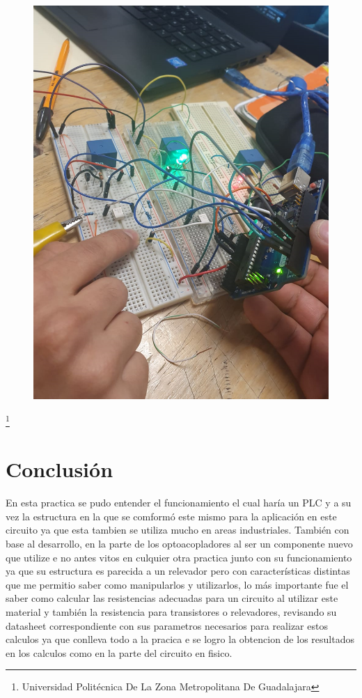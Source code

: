 \documentclass[10pt,a4paper]{article}
\begin{document}
\begin{figure}[hbtp]
\centering
\includegraphics[scale=0.27]{005.png} 
\end{figure}
\footnote{Universidad Politécnica De La Zona Metropolitana De Guadalajara}
\newpage
\section{Conclusión}
En esta practica se pudo entender el funcionamiento el cual haría un PLC y a su vez la estructura en la que se comformó este mismo para la aplicación en este circuito ya que esta tambien se utiliza mucho en areas industriales. También con base al desarrollo, en la parte de los optoacopladores al ser un componente nuevo que utilize e no antes vitos en culquier otra practica junto con su funcionamiento ya que su estructura es parecida a un relevador pero con características distintas que me permitio saber como manipularlos y utilizarlos, lo más importante fue el saber como calcular las resistencias adecuadas para un circuito al utilizar este material y también la resistencia para transistores o relevadores, revisando su datasheet correspondiente con sus parametros necesarios para realizar estos calculos ya que conlleva todo a la pracica e se logro la obtencion de los resultados en los calculos como en la parte del circuito en fisico.
\end{document}

